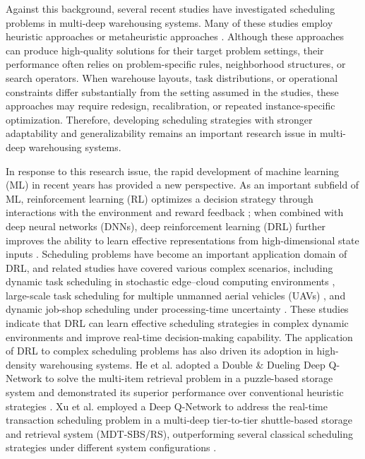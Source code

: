 Against this background, several recent studies have investigated scheduling problems in multi-deep warehousing systems. Many of these studies employ heuristic approaches \cite{Dong2021,Yang2023} or metaheuristic approaches \cite{Ren2025,Liu2026}. Although these approaches can produce high-quality solutions for their target problem settings, their performance often relies on problem-specific rules, neighborhood structures, or search operators. When warehouse layouts, task distributions, or operational constraints differ substantially from the setting assumed in the studies, these approaches may require redesign, recalibration, or repeated instance-specific optimization. Therefore, developing scheduling strategies with stronger adaptability and generalizability remains an important research issue in multi-deep warehousing systems.

In response to this research issue, the rapid development of machine learning (ML) in recent years has provided a new perspective. As an important subfield of ML, reinforcement learning (RL) optimizes a decision strategy through interactions with the environment and reward feedback \cite{SuttonBarto2018}; when combined with deep neural networks (DNNs), deep reinforcement learning (DRL) further improves the ability to learn effective representations from high-dimensional state inputs \cite{Mnih2015}. Scheduling problems have become an important application domain of DRL, and related studies have covered various complex scenarios, including dynamic task scheduling in stochastic edge--cloud computing environments \cite{Lu2024}, large-scale task scheduling for multiple unmanned aerial vehicles (UAVs) \cite{Mao2025}, and dynamic job-shop scheduling under processing-time uncertainty \cite{Wu2024}. These studies indicate that DRL can learn effective scheduling strategies in complex dynamic environments and improve real-time decision-making capability. The application of DRL to complex scheduling problems has also driven its adoption in high-density warehousing systems. He et al. adopted a Double \& Dueling Deep Q-Network to solve the multi-item retrieval problem in a puzzle-based storage system and demonstrated its superior performance over conventional heuristic strategies \cite{He2023}. Xu et al. employed a Deep Q-Network to address the real-time transaction scheduling problem in a multi-deep tier-to-tier shuttle-based storage and retrieval system (MDT-SBS/RS), outperforming several classical scheduling strategies under different system configurations \cite{Xu2026}.

